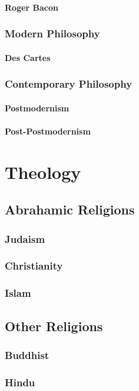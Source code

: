 			\paragraph{Roger Bacon}
		\subsubsection{Modern Philosophy}
			\paragraph{Des Cartes}
			
		\subsubsection{Contemporary Philosophy}
			\paragraph{Postmodernism}
			\paragraph{Post-Postmodernism}
	
	\section{Theology}
		\subsection{Abrahamic Religions}
			\subsubsection{Judaism}
			\subsubsection{Christianity}
			\subsubsection{Islam}
		\subsection{Other Religions}
			\subsubsection{Buddhist}
			\subsubsection{Hindu}
		
	
		